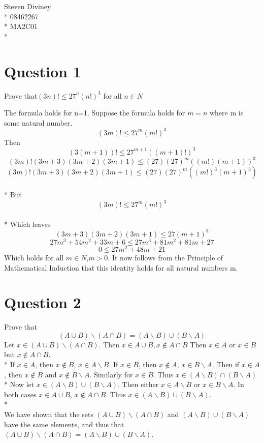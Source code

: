 \documentclass[a4paper,12pt]{article}
\begin{document}
\begin{center}
  {\large Steven Diviney} \\*
  08462267 \\*
  MA2C01 \\*

\end{center}

\clearpage
\section{Question 1}

Prove that$(3n)! \leq {27}^n(n!)^3$ for all $n \in N$

The formula holds for n=1.
Suppose the formula holds for $m=n$ where m is some natural number.
\[ (3m)! \leq {27}^m(m!)^3 \]
Then \[(3(m + 1))! \leq {27}^{m + 1}((m + 1)!)^3\]
\[(3m)!(3m + 3)(3m + 2)(3m + 1) \leq (27)(27)^m{((m!)(m + 1))}^3\]
\[(3m)!(3m + 3)(3m + 2)(3m + 1) \leq (27)(27)^m({(m!)}^3{(m + 1)}^3)\]
\\*
But \[(3m)! \leq 27^m(m!)^3\]
\\*
Which leaves \[(3m + 3)(3m + 2)(3m + 1) \leq 27{(m + 1)}^3\]
\[27{m}^3 + 54{m}^2 + 33m + 6 \leq 27{m}^3 + 81{m}^2 + 81m + 27\]
\[0 \leq 27m^2 + 48m + 21\]
Which holds for all $m \in N$,$m > 0$.
It now follows from the Principle of Mathematical Induction that this identity holds for all natural numbers m.

\section{Question 2}
Prove that \[(A \cup B) \backslash (A \cap B) = (A \backslash B) \cup (B \backslash A)\]
Let $x \in (A \cup B)\backslash(A \cap B)$. Then $x \in A \cup B, x \notin A \cap B$
Then $x \in A$ or $x \in B$ but $x \notin A \cap B$.
\\*
If $x \in A$, then $x \notin B$, $x \in A \backslash B$. If $x \in B$, then $x \notin A$, $x \in B \backslash A$.
Then if $x \in A$, then $x \notin B$ and $x \notin B \backslash A$. Similarly for $x \in B$.
Thus $x \in (A \backslash B) \cap (B \backslash A)$
\\*
Now let $x \in (A \backslash B) \cup (B \backslash A)$. Then either $x \in A \backslash B$ or $x \in B \backslash A$. 
In both cases $x \in A \cup B$, $x \notin A \cap B$. Thus $x \in (A \backslash B) \cup (B \backslash A)$.
\\*
\\
We have shown that the sets $(A \cup B) \backslash (A \cap B)$ and $(A \backslash B) \cup (B \backslash A)$
have the same elements, and thus that $(A \cup B) \backslash (A \cap B) = (A \backslash B) \cup (B \backslash A)$.
\end{document}
